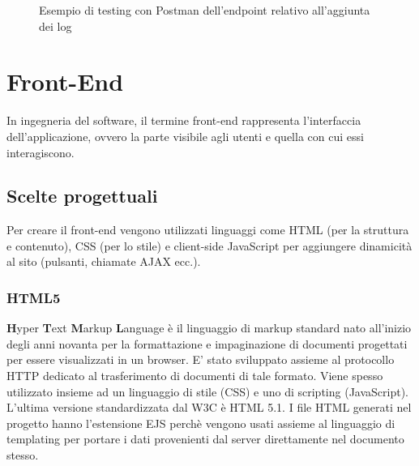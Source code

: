 \documentclass[12pt]{report}
\begin{document}
\begin{figure}
	\caption{Esempio di testing con Postman dell'endpoint relativo all'aggiunta dei log}
	\label{fig:postman_test}
\end{figure}

%
\section{Front-End}
%

In ingegneria del software, il termine front-end rappresenta l'interfaccia dell'applicazione, ovvero la parte visibile agli utenti e quella con cui essi interagiscono.

%
\subsection{Scelte progettuali}
%

Per creare il front-end vengono utilizzati linguaggi come HTML (per la struttura e contenuto), CSS (per lo stile) e client-side JavaScript per aggiungere dinamicità al sito (pulsanti, chiamate AJAX ecc.).

%
\subsubsection*{HTML5}
%
\textbf{H}yper \textbf{T}ext \textbf{M}arkup \textbf{L}anguage è il linguaggio di markup standard nato all'inizio degli anni novanta per la formattazione e impaginazione di documenti progettati per essere visualizzati in un browser. E' stato sviluppato assieme al protocollo HTTP dedicato al trasferimento di documenti di tale formato. Viene spesso utilizzato insieme ad un linguaggio di stile (CSS) e uno di scripting (JavaScript). L'ultima versione standardizzata dal W3C è HTML 5.1.
I file HTML generati nel progetto hanno l'estensione EJS perchè vengono usati assieme al linguaggio di templating per portare i dati provenienti dal server direttamente nel documento stesso.
%
\end{document}
